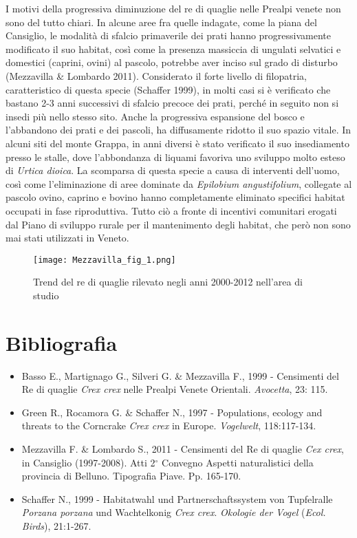 I motivi della progressiva diminuzione del re di quaglie nelle Prealpi
venete non sono del tutto chiari. In alcune aree fra quelle indagate,
come la piana del Cansiglio, le modalit\`a di sfalcio primaverile dei
prati hanno progressivamente modificato il suo habitat, cos\`i come la
presenza massiccia di ungulati selvatici e domestici (caprini, ovini)
al pascolo, potrebbe aver inciso sul grado di disturbo (Mezzavilla \&
Lombardo 2011). Considerato il forte livello di filopatria,
caratteristico di questa specie (Schaffer 1999), in molti casi si \`e
verificato che bastano 2-3 anni successivi di sfalcio precoce dei
prati, perch\'e in seguito non si insedi pi\`u nello stesso sito. Anche
la progressiva espansione del bosco e l{\textquoteright}abbandono dei
prati e dei pascoli, ha diffusamente ridotto il suo spazio vitale. In
alcuni siti del monte Grappa, in anni diversi \`e stato verificato il
suo insediamento presso le stalle, dove l{\textquoteright}abbondanza di
liquami favoriva uno sviluppo molto esteso di \textit{Urtica dioica}.
La scomparsa di questa specie a causa di interventi
dell{\textquoteright}uomo, cos\`i come l{\textquoteright}eliminazione
di aree dominate da \textit{Epilobium angustifolium}, collegate al
pascolo ovino, caprino e bovino hanno completamente eliminato 
specifici habitat occupati in fase riproduttiva. Tutto ci\`o a fronte
di incentivi comunitari erogati dal Piano di sviluppo rurale  per il
mantenimento degli habitat, che per\`o non sono mai stati utilizzati in
Veneto.

\begin{figure}[!h]
\centering
\texttt{[image: Mezzavilla\_fig\_1.png]}
\caption{Trend del re di quaglie rilevato negli anni 2000-2012 nell{\textquoteright}area di studio}
\label{Mezzavilla_fig_1}
\end{figure}

\section*{Bibliografia}

\begin{itemize}\itemsep0pt
	\item Basso E., Martignago G., Silveri G. \& Mezzavilla F., 1999 - Censimenti
del Re di quaglie \textit{Crex crex} nelle Prealpi Venete Orientali.
\textit{Avocetta}, 23: 115.

	\item Green R., Rocamora G. \& Schaffer N., 1997 - Populations, ecology and
threats to the Corncrake \textit{Crex crex} in Europe.
\textit{Vogelwelt}, 118:117-134.

	\item Mezzavilla F. \& Lombardo S., 2011 - Censimenti del Re di quaglie
\textit{Cex crex}, in Cansiglio (1997-2008). Atti 2$^\circ$
Convegno Aspetti naturalistici della provincia di Belluno. Tipografia
Piave. Pp. 165-170.

	\item Schaffer N., 1999 - Habitatwahl und Partnerschaftssystem von Tupfelralle
\textit{Porzana porzana} und Wachtelkonig \textit{Crex crex}.
\textit{Okologie der Vogel} (\textit{Ecol. Birds}), 21:1-267.
\end{itemize}